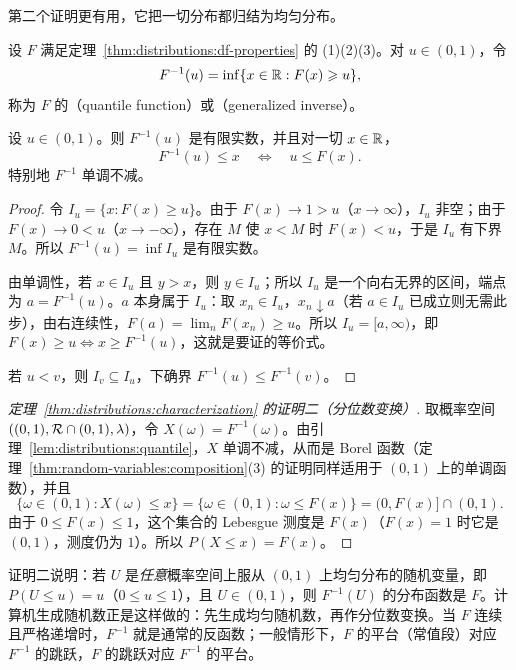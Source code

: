 第二个证明更有用，它把一切分布都归结为均匀分布。

\begin{definition}[分位数函数]\label{def:distributions:quantile}
设 $F$ 满足定理~\ref{thm:distributions:df-properties} 的 (1)(2)(3)。对 $u\in(0,1)$，令
\[
F^{-1}(u)=\inf\{x\in\mathbb{R}: F(x)\geqslant u\},
\]
称为 $F$ 的（quantile function）或（generalized inverse）。
\end{definition}

\begin{lemma}\label{lem:distributions:quantile}
设 $u\in(0,1)$。则 $F^{-1}(u)$ 是有限实数，并且对一切 $x\in\mathbb{R}$，
\[
F^{-1}(u)\leqslant x\quad\Longleftrightarrow\quad u\leqslant F(x).
\]
特别地 $F^{-1}$ 单调不减。
\end{lemma}
\begin{proof}
令 $I_u=\{x:F(x)\geqslant u\}$。由于 $F(x)\to1>u$（$x\to\infty$），$I_u$ 非空；由于 $F(x)\to0<u$（$x\to-\infty$），存在 $M$ 使 $x<M$ 时 $F(x)<u$，于是 $I_u$ 有下界 $M$。所以 $F^{-1}(u)=\inf I_u$ 是有限实数。

由单调性，若 $x\in I_u$ 且 $y>x$，则 $y\in I_u$；所以 $I_u$ 是一个向右无界的区间，端点为 $a=F^{-1}(u)$。$a$ 本身属于 $I_u$：取 $x_n\in I_u$，$x_n\downarrow a$（若 $a\in I_u$ 已成立则无需此步），由右连续性，$F(a)=\lim_nF(x_n)\geqslant u$。所以 $I_u=[a,\infty)$，即 $F(x)\geqslant u\iff x\geqslant F^{-1}(u)$，这就是要证的等价式。

若 $u<v$，则 $I_v\subseteq I_u$，下确界 $F^{-1}(u)\leqslant F^{-1}(v)$。
\end{proof}

\begin{proof}[定理~\ref{thm:distributions:characterization} 的证明二（分位数变换）]
取概率空间 $((0,1),\mathcal{R}\cap(0,1),\lambda)$，令 $X(\omega)=F^{-1}(\omega)$。由引理~\ref{lem:distributions:quantile}，$X$ 单调不减，从而是 Borel 函数（定理~\ref{thm:random-variables:composition}(3) 的证明同样适用于 $(0,1)$ 上的单调函数），并且
\[
\{\omega\in(0,1): X(\omega)\leqslant x\}=\{\omega\in(0,1):\omega\leqslant F(x)\}=(0,F(x)]\cap(0,1).
\]
由于 $0\leqslant F(x)\leqslant1$，这个集合的 Lebesgue 测度是 $F(x)$（$F(x)=1$ 时它是 $(0,1)$，测度仍为 $1$）。所以 $P(X\leqslant x)=F(x)$。
\end{proof}

\begin{remark}[分位数变换]
证明二说明：若 $U$ 是\emph{任意}概率空间上服从 $(0,1)$ 上均匀分布的随机变量，即 $P(U\leqslant u)=u$（$0\leqslant u\leqslant1$），且 $U\in(0,1)$，则 $F^{-1}(U)$ 的分布函数是 $F$。计算机生成随机数正是这样做的：先生成均匀随机数，再作分位数变换。当 $F$ 连续且严格递增时，$F^{-1}$ 就是通常的反函数；一般情形下，$F$ 的平台（常值段）对应 $F^{-1}$ 的跳跃，$F$ 的跳跃对应 $F^{-1}$ 的平台。
\end{remark}


